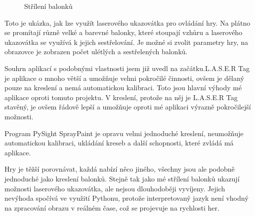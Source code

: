 \documentclass[twoside,12pt]{article}
\begin{document}
\begin{figure}[ht]
 \begin{center}
 \end{center}
 \caption{Střílení balonků}
\end{figure}
Toto je ukázka, jak lze využít laserového ukazovátka pro ovládání hry. Na plátno se promítají různě velké a barevné balonky, které stoupají vzhůru a laserového ukazovátka se využívá k jejich sestřelování. Je možné si zvolit parametry hry, na obrazovce je zobrazen počet ulétlých a sestřelených balonků.

Souhrn aplikací s podobnými vlastnosti jsem již uvedl na začátku.L.A.S.E.R Tag je aplikace o mnoho větší a umožňuje velmi pokročilé činnosti, ovšem je dělaný pouze na kreslení a nemá automatickou kalibraci. Toto jsou hlavní výhody mé aplikace oproti tomuto projektu. V kreslení, protože na něj je L.A.S.E.R Tag stavěný, je ovšem řádově lepší a umožňuje oproti mé aplikaci výrazně pokročilejší možnosti.

Program PySight SprayPaint je opravu velmi jednoduché kreslení, neumožňuje automatickou kalibraci, ukládání kreseb a další schopnosti, které zvládá má aplikace.

Hry je těžší porovnávat, každá nabízí něco jiného, všechny jsou ale podobně jednoduché jako kreslení balonků. Stejně tak jako mé střílení balonků ukazují možnosti laserového ukazovátka, ale nejsou dlouhodoběji vyvíjeny. Jejich nevýhoda spočívá ve využití Pythonu, protože interpretovaný jazyk není vhodný na zpracování obrazu v reálném čase, což se projevuje na rychlosti her.
\end{document}
